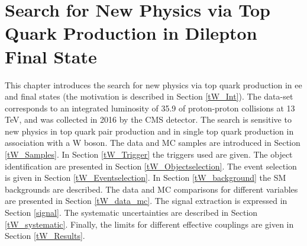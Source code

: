 \chapter{Search for New Physics via Top Quark Production in Dilepton Final State}\label{chap:tW}
This chapter introduces the search for new physics via top quark production in ee and \mumu final states (the motivation is described in Section \ref{tW_Int}). The data-set corresponds to an integrated luminosity of 35.9 \fbinv of proton-proton collisions at 13 TeV, and was collected in 2016 by the CMS detector. The search is sensitive to new physics in top quark pair production and in single top quark production in association with a W boson. The data and MC samples are introduced in Section \ref{tW_Samples}. In Section \ref{tW_Trigger} the triggers used are given. The object identification are presented in Section \ref{tW_Objectselection}. The event selection is given in Section \ref{tW_Eventselection}. In Section \ref{tW_background} the SM backgrounds are described. The data and MC comparisons for different variables are presented in Section \ref{tW_data_mc}. The signal extraction is expressed in Section \ref{signal}. The systematic uncertainties are described in Section \ref{tW_systematic}. Finally, the limits for different effective couplings are given in Section \ref{tW_Results}.













